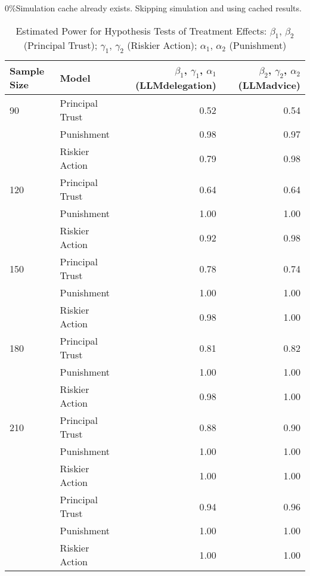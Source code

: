 \documentclass[
]{article}
\begin{document}
\textbar{} \textbar{} \textbar{} 0\%Simulation cache already exists.
Skipping simulation and using cached results.

\begin{table}[!h]

\caption{\label{tab:plot_power}Estimated Power for Hypothesis Tests of Treatment Effects: $\beta_1$, $\beta_2$ (Principal Trust); $\gamma_1$, $\gamma_2$ (Riskier Action); $\alpha_1$, $\alpha_2$ (Punishment)}
\centering
\fontsize{10}{12}\selectfont
\begin{tabular}{llrr}
\toprule
Sample Size & Model & $\beta_1$, $\gamma_1$, $\alpha_1$ (LLMdelegation) & $\beta_2$, $\gamma_2$, $\alpha_2$ (LLMadvice)\\
[1.5ex]
\midrule
90 & Principal Trust & 0.52 & 0.54\\
[1.5ex]
 & Punishment & 0.98 & 0.97\\
[1.5ex]
 & Riskier Action & 0.79 & 0.98\\
[1.5ex]
120 & Principal Trust & 0.64 & 0.64\\
[1.5ex]
 & Punishment & 1.00 & \vphantom{4} 1.00\\
[1.5ex]
\addlinespace
 & Riskier Action & 0.92 & 0.98\\
[1.5ex]
150 & Principal Trust & 0.78 & 0.74\\
[1.5ex]
 & Punishment & 1.00 & \vphantom{3} 1.00\\
[1.5ex]
 & Riskier Action & 0.98 & \vphantom{1} 1.00\\
[1.5ex]
180 & Principal Trust & 0.81 & 0.82\\
[1.5ex]
\addlinespace
 & Punishment & 1.00 & \vphantom{2} 1.00\\
[1.5ex]
 & Riskier Action & 0.98 & 1.00\\
[1.5ex]
210 & Principal Trust & 0.88 & 0.90\\
[1.5ex]
 & Punishment & 1.00 & \vphantom{1} 1.00\\
[1.5ex]
 & Riskier Action & 1.00 & \vphantom{1} 1.00\\
[1.5ex]
\addlinespace
240 & Principal Trust & 0.94 & 0.96\\
[1.5ex]
 & Punishment & 1.00 & 1.00\\
[1.5ex]
 & Riskier Action & 1.00 & 1.00\\
[1.5ex]
\bottomrule
\end{tabular}
\end{table}
\end{document}
